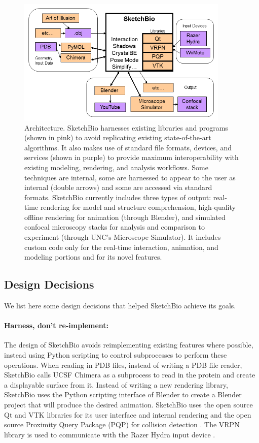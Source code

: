 \documentclass[twocolumn]{bmcart}%
\begin{document}
\begin{figure}[ht]
    \begin{center}
    \noindent\includegraphics[width=0.9\textwidth]
    {system_diagram.png}
    \end{center}
\caption{Architecture.
SketchBio harnesses existing libraries and programs (shown in pink) to avoid replicating existing state-of-the-art algorithms.
It also makes use of standard file formats, devices, and services (shown in purple) to provide maximum interoperability with existing modeling, rendering, and analysis workflows.
Some techniques are internal, some are harnessed to appear to the user as internal (double arrows) and some are accessed via standard formats.
SketchBio currently includes three types of output: real-time rendering for model and structure comprehension, high-quality offline rendering for animation (through Blender), and simulated confocal microscopy stacks for analysis and comparison to experiment (through UNC's Microscope Simulator).
It includes custom code only for the real-time interaction, animation, and modeling portions and for its novel features.}
\label{fig:architecture}
\end{figure}

\subsection*{Design Decisions}
We list here some design decisions that helped SketchBio achieve its goals.

\paragraph*{Harness, don't re-implement:} The design of SketchBio avoids reimplementing existing features where possible, instead using Python scripting to control subprocesses to perform these operations.
When reading in PDB files, instead of writing a PDB file reader, SketchBio calls UCSF Chimera as a subprocess to read in the protein and create a displayable surface from it.
Instead of writing a new rendering library, SketchBio uses the Python scripting interface of Blender to create a Blender project that will produce the desired animation.
SketchBio uses the open source Qt and VTK\cite{VTKbook} libraries for its user interface and internal rendering and the open source Proximity Query Package (PQP) for collision detection \cite{PQP}.
The VRPN library is used to communicate with the Razer Hydra input device \cite{taylor2001vrpn}.
\end{document}
